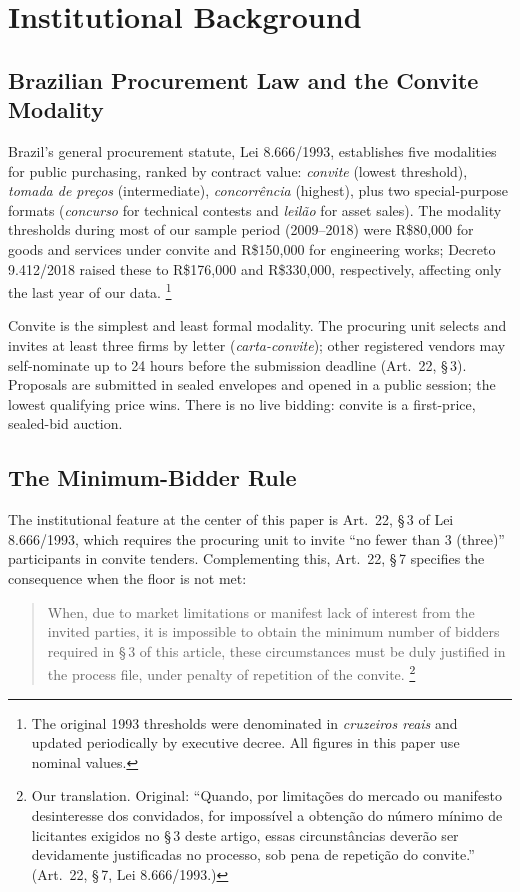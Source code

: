 \section{Institutional Background}
\label{sec:institutional}

\subsection{Brazilian Procurement Law and the Convite Modality}
\label{sec:lei8666}

Brazil's general procurement statute, Lei 8.666/1993, establishes
five modalities for public purchasing, ranked by contract value:
\emph{convite} (lowest threshold), \emph{tomada de pre\c{c}os}
(intermediate), \emph{concorr\^encia} (highest), plus two
special-purpose formats (\emph{concurso} for technical contests and
\emph{leil\~ao} for asset sales). The modality thresholds during
most of our sample period (2009--2018) were R\$80,000 for goods
and services under convite and R\$150,000 for engineering works;
Decreto 9.412/2018 raised these to R\$176,000 and R\$330,000,
respectively, affecting only the last year of our data.%
\footnote{The original 1993 thresholds were denominated in
\emph{cruzeiros reais} and updated periodically by executive
decree. All figures in this paper use nominal values.}

Convite is the simplest and least formal modality. The procuring
unit selects and invites at least three firms by letter
(\emph{carta-convite}); other registered vendors may
self-nominate up to 24 hours before the submission deadline
(Art.\ 22, \S\,3). Proposals are submitted in sealed envelopes and
opened in a public session; the lowest qualifying price wins.
There is no live bidding: convite is a first-price, sealed-bid
auction.

\subsection{The Minimum-Bidder Rule}
\label{sec:min_bidder}

The institutional feature at the center of this paper is
Art.\ 22, \S\,3 of Lei 8.666/1993, which requires the procuring
unit to invite ``no fewer than 3 (three)'' participants in
convite tenders. Complementing this, Art.\ 22, \S\,7 specifies
the consequence when the floor is not met:

\begin{quote}
\small
When, due to market limitations or manifest lack of interest from
the invited parties, it is impossible to obtain the minimum number
of bidders required in \S\,3 of this article, these circumstances
must be duly justified in the process file, under penalty of
repetition of the convite.%
\footnote{Our translation. Original: ``Quando, por limita\c{c}\~oes
do mercado ou manifesto desinteresse dos convidados, for
imposs\'ivel a obten\c{c}\~ao do n\'umero m\'inimo de licitantes
exigidos no \S\,3\textordmasculine{} deste artigo, essas
circunst\^ancias dever\~ao ser devidamente justificadas no
processo, sob pena de repeti\c{c}\~ao do convite.'' (Art.\ 22,
\S\,7, Lei 8.666/1993.)}
\end{quote}


